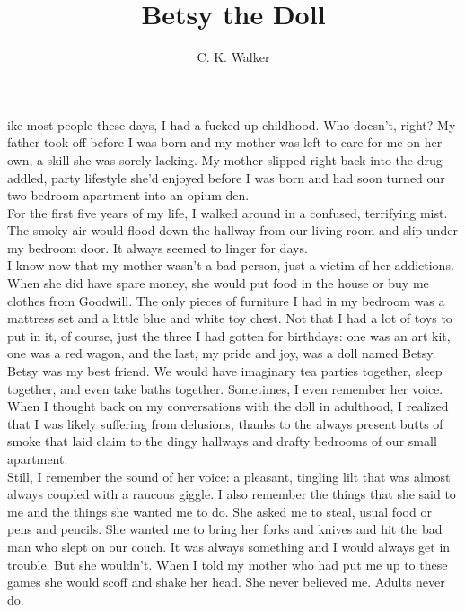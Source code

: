 \documentclass[a5paper]{scrartcl}
\title{Betsy the Doll}
\author{C. K. Walker}
\begin{document}
\maketitle

ike most people these days, I had a fucked up childhood. Who doesn't, right? My father took off before I was born and my mother was left to care for me on her own, a skill she was sorely lacking. My mother slipped right back into the drug-addled, party lifestyle she'd enjoyed before I was born and had soon turned our two-bedroom apartment into an opium den. \\

For the first five years of my life, I walked around in a confused, terrifying mist. The smoky air would flood down the hallway from our living room and slip under my bedroom door. It always seemed to linger for days.\\

I know now that my mother wasn't a bad person, just a victim of her addictions. When she did have spare money, she would put food in the house or buy me clothes from Goodwill. The only pieces of furniture I had in my bedroom was a mattress set and a little blue and white toy chest. Not that I had a lot of toys to put in it, of course, just the three I had gotten for birthdays: one was an art kit, one was a red wagon, and the last, my pride and joy, was a doll named Betsy.\\

Betsy was my best friend. We would have imaginary tea parties together, sleep together, and even take baths together. Sometimes, I even remember her voice.\\

When I thought back on my conversations with the doll in adulthood, I realized that I was likely suffering from delusions, thanks to the always present butts of smoke that laid claim to the dingy hallways and drafty bedrooms of our small apartment. \\

Still, I remember the sound of her voice: a pleasant, tingling lilt that was almost always coupled with a raucous giggle. I also remember the things that she said to me and the things she wanted me to do. She asked me to steal, usual food or pens and pencils. She wanted me to bring her forks and knives and hit the bad man who slept on our couch. It was always something and I would always get in trouble. But she wouldn't. When I told my mother who had put me up to these games she would scoff and shake her head. She never believed me. Adults never do.\\
\end{document}
